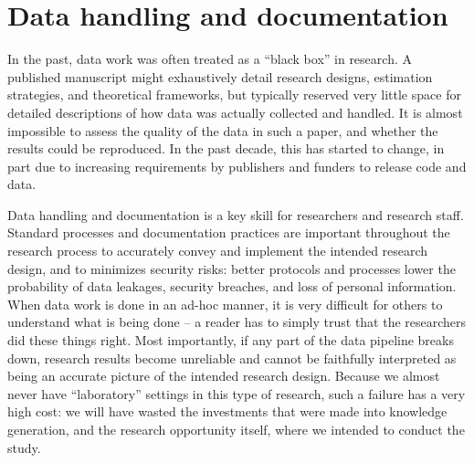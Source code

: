 {%

\section{Data handling and documentation}

In the past, data work was often treated as a ``black box'' in research.
A published manuscript might exhaustively detail
research designs, estimation strategies, and theoretical frameworks,
but typically reserved very little space for detailed descriptions
of how data was actually collected and handled.
It is almost impossible to assess the quality of the data in such a paper,
and whether the results could be reproduced.
In the past decade, this has started to change,
in part due to increasing requirements by publishers and funders to release code and data.

Data handling and documentation is a key skill for researchers and research staff.
Standard processes and documentation practices
are important throughout the research process to accurately convey
and implement the intended research design,
and to minimizes security risks: 
better protocols and processes lower the probability of data leakages, 
security breaches, and loss of personal information.
When data work is done in an ad-hoc manner,
it is very difficult for others to understand what is being done --
a reader has to simply trust that the researchers did these things right.
Most importantly, if any part of the data pipeline breaks down,
research results become unreliable
and cannot be faithfully interpreted
as being an accurate picture of the intended research design.
Because we almost never have ``laboratory'' settings
in this type of research,
such a failure has a very high cost:
we will have wasted the investments that were made into knowledge generation,
and the research opportunity itself,
where we intended to conduct the study.

}
